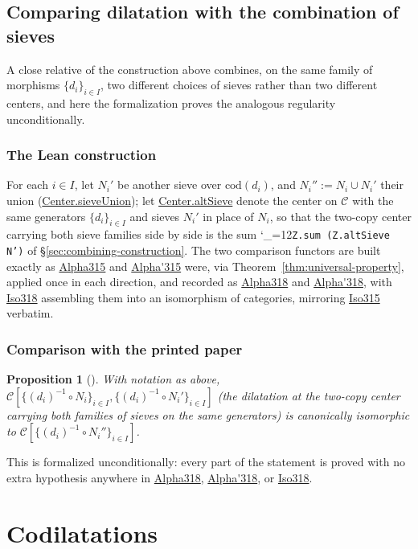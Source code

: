 \documentclass[11pt]{amsart}
\newcommand{\lc}[1]{\url{#1}}
\newcommand{\lcode}{\begingroup\catcode`\_=12\relax\lcodeInner}
\newcommand{\lcodeInner}[1]{\texttt{#1}\endgroup}
\theoremstyle{plain}
\newtheorem{proposition}[theorem]{Proposition}
\theoremstyle{definition}
\theoremstyle{remark}
\newcommand{\calC}{\mathcal C}
\newcommand{\cod}{\mathrm{cod}}
\begin{document}
\subsection{Comparing dilatation with the combination of sieves}
\label{sec:combining-sieves}

A close relative of the construction above combines, on the same family of morphisms
$\{d_i\}_{i\in I}$, two different choices of sieves rather than two different centers, and here
the formalization proves the analogous regularity unconditionally.

\subsubsection*{The Lean construction}
For each $i \in I$, let $N_i'$ be another sieve over $\cod(d_i)$, and $N_i'' := N_i\cup N_i'$
their union (\lc{Center.sieveUnion}); let \lc{Center.altSieve} denote the center on $\calC$
with the same generators $\{d_i\}_{i\in I}$ and sieves $N_i'$ in place of $N_i$, so that the
two-copy center carrying both sieve families side by side is the sum
\lcode{Z.sum (Z.altSieve N')} of \S\ref{sec:combining-construction}. The two comparison
functors are built exactly as \lc{Alpha315} and \lc{Alpha'315} were, via
Theorem~\ref{thm:universal-property}, applied once in each direction, and recorded as
\lc{Alpha318} and \lc{Alpha'318}, with \lc{Iso318} assembling them into an isomorphism of
categories, mirroring \lc{Iso315} verbatim.

\subsubsection*{Comparison with the printed paper}
\begin{proposition}[{\citep[Proposition~3.18]{Mayeux}}]
\label{prop:sieve-union}
With notation as above, $\calC[\{(d_i)^{-1}\circ N_i\}_{i\in I}, \{(d_i)^{-1}\circ
N_i'\}_{i\in I}]$ (the dilatation at the two-copy center carrying both families of sieves
on the same generators) is canonically isomorphic to
$\calC[\{(d_i)^{-1}\circ N_i''\}_{i\in I}]$.
\end{proposition}
This is formalized unconditionally: every part of the statement is proved with no extra
hypothesis anywhere in \lc{Alpha318}, \lc{Alpha'318}, or \lc{Iso318}.

\section{Codilatations}
\label{sec:codilatations}
\end{document}
